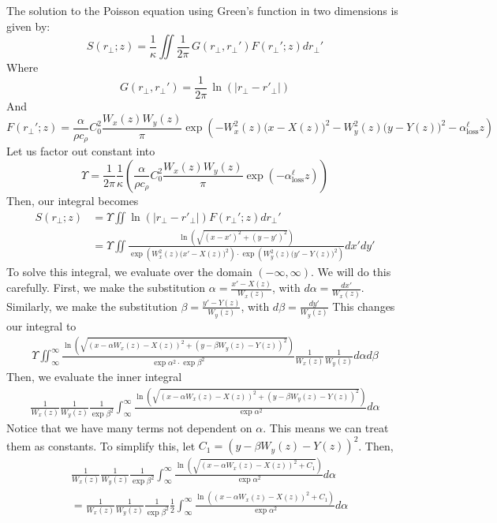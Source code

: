 \documentclass[a4paper, 12pt]{amsbook}
\begin{document}
    \newpage
    The solution to the Poisson equation using Green's function in two dimensions is given by:
$$S(r_{\perp};z) = \frac{1}{\kappa} \iint \frac{1}{2\pi}\, G(r_\perp, r_\perp ')  F(r_{\perp}'; z)  d r_{\perp}' $$
Where 
$$G(r_\perp, r_\perp ') = \frac{1}{2\pi}\, \ln{(|r_{\perp} - r'_{\perp}|)} $$
And $$F(r_{\perp}'; z) = \frac{\alpha }{\rho c_\rho} C_0^2 \frac{ W_{x}(z) W_{y}(z)}{\pi} \exp{\left(-W_{x}^{2}(z) \big( x - X(z) \big)^{2} - W_{y}^{2}(z) \big( y - Y(z) \big)^{2} - \alpha^\ell_\text{loss} z \right)}$$
Let us factor out constant into $$\Upsilon = \frac{1}{2\pi} \frac{1}{\kappa} \left( \frac{\alpha }{\rho c_\rho} C_0^2 \frac{ W_{x}(z) W_{y}(z)}{\pi} \exp{(- \alpha^\ell_\text{loss} z)} \right)$$
Then, our integral becomes 
\begin{equation*}
\begin{aligned}
    S(r_{\perp};z) &= \Upsilon \iint \ln{(|r_{\perp} - r'_{\perp}|)}  F(r_{\perp}'; z)  d r_{\perp}' \\
    &= \Upsilon \iint \frac{\ln{\left(\sqrt{(x-x')^2 + (y-y')^2}\right)}}{\exp{(W_{x}^{2}(z) \big( x' - X(z) \big)^{2})} \cdot \exp({W_{y}^{2}(z) \big( y' - Y(z) \big)^{2}}) } dx'dy' 
\end{aligned}
\end{equation*}
To solve this integral, we evaluate over the domain $(-\infty, \infty)$. We will do this carefully. First, we make the substitution $\alpha = \frac{x' - X(z)}{W_x(z)}$, with $d\alpha = \frac{dx'}{W_x(z)}$. Similarly, we make the substitution $\beta = \frac{y' - Y(z)}{W_y(z)}$, with $d\beta = \frac{dy'}{W_y(z)}$ This changes our integral to 
\begin{equation*}
    \begin{aligned}
        \Upsilon \iint_\infty ^\infty \frac{\ln{\left(\sqrt{(x-\alpha W_x(z) - X(z))^2 + (y-\beta W_y(z) - Y(z))^2}\right)}}{\exp{ \alpha^{2}} \cdot \exp \beta^{2}} \frac{1}{W_x(z)} \frac{1}{W_y(z)} d\alpha d\beta 
    \end{aligned}
\end{equation*}
Then, we evaluate the inner integral
\begin{equation*}
    \begin{aligned}
        \frac{1}{W_x(z)} \frac{1}{W_y(z)} \frac{1}{\exp \beta^{2}} \int_\infty ^\infty \frac{\ln{\left(\sqrt{(x-\alpha W_x(z) - X(z))^2 + (y-\beta W_y(z) - Y(z))^2}\right)}}{\exp{ \alpha^{2}}} d\alpha 
    \end{aligned}
\end{equation*}
Notice that we have many terms not dependent on $\alpha$. This means we can treat them as constants. To simplify this, let $C_1 = (y-\beta W_y(z) - Y(z))^2$. Then,
\begin{equation*}
    \begin{aligned}
        &\frac{1}{W_x(z)} \frac{1}{W_y(z)} \frac{1}{\exp \beta^{2}} \int_\infty ^\infty \frac{\ln{\left(\sqrt{(x-\alpha W_x(z) - X(z))^2 + C_1}\right)}}{\exp{ \alpha^{2}}} d\alpha \\
        &=\frac{1}{W_x(z)} \frac{1}{W_y(z)} \frac{1}{\exp \beta^{2}} \frac{1}{2}\int_\infty ^\infty \frac{\ln{\left((x-\alpha W_x(z) - X(z))^2 + C_1\right)}}{\exp{ \alpha^{2}}} d\alpha 
    \end{aligned}
\end{equation*}
\end{document}
